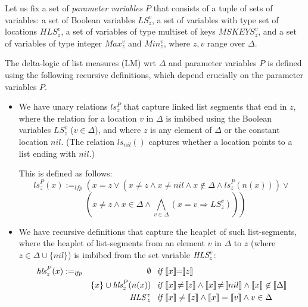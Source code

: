 \begin{definition}
Let us fix a set of \emph{parameter variables} $P$ that consists of a tuple of sets of variables:
a set of Boolean variables $LS_z^v$, a set of variables with type set of locations
$HLS_z^v$, a set of variables of type multiset of keys $MSKEYS_z^v$, and
a set of variables of type integer $Max_z^v$ and $Min_z^v$, where $z,v$ range over $\Delta$.

The delta-logic of list measures (LM) wrt $\Delta$ and parameter variables $P$ is defined using the following recursive definitions, which depend crucially on the parameter variables $P$.
\begin{itemize}
	\item We have unary relations $ls_z^P$ that capture linked list segments 
	       that end in $z$, where
	         the relation for a location $v$ in $\Delta$ is imbibed using the Boolean variables $LS_z^v$ ($v \in \Delta$),
	      and where $z$ is any element of $\Delta$ or the constant location $\textit{nil}$.
	      (The relation $ls_\textit{nil}()$ captures whether a location points to a list
	       ending with $\textit{nil}$.)
	
	This is defined as follows:
	$$\textit{ls}_z^P(x)\!\!:=_{\textit{lfp}}\!\! \left( x\!\!=\!\!\textit{z} \vee \left( x \!\not =\! z \wedge x \!\not=\! nil \wedge x \not \in \Delta \wedge \textit{ls}_z^P(n(x))\right) 
	\vee\right.$$
	$$~~~~ \left.\left(x \!\not =\! z \wedge x \in \Delta \wedge \bigwedge_{v \in \Delta} (x=v \Rightarrow LS_z^v)\right)\right)$$ 
	           

    \item We have recursive definitions that capture the heaplet of such list-segments, where the heaplet
of list-segments from an element $v$ in $\Delta$ to $z$ (where $z \in \Delta \cup \{nil\}$) is imbibed from the set variable $\textit{HLS}_z^v$:
\begin{align*}
\textit{hls}_z^P(x) & :=_{\textit{lfp}} & \emptyset & \textit{~~if~} \sem{x}\!\!=\!\!\sem{z} \\
& & \{x\} \cup \textit{hls}_z^P(n(x)) & \textit{~~if~} \sem{x} \!\not =\! \sem{z} \wedge \sem{x} \!\not=\! \sem{nil} \wedge \sem{x} \not \in \sem{\Delta} \\
& & \HLS\,_z^v & \textit{~~if~} \sem{x} \not = \sem{z} \wedge \sem{x}=\sem{v} \wedge v \in \Delta 
\end{align*}


\end{itemize}
\end{definition}
